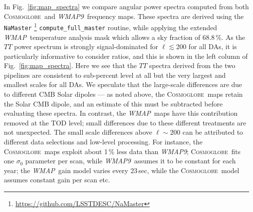 \documentclass[twocolumn]{../../common/aa}
\def\WMAP{\emph{WMAP}}
\def\WMAPnine{\emph{WMAP9}}
\newcommand{\cosmoglobe}{\textsc{Cosmoglobe}}
\newcommand{\K}[0]{\textit K}
\begin{document}










In Fig.~\ref{fig:map_spectra} we compare angular power spectra computed from both  \cosmoglobe\ and \WMAPnine\ frequency maps. These spectra are derived using the \texttt{NaMaster} \citep{namaster}\footnote{\url{https://github.com/LSSTDESC/NaMaster}} \texttt{compute\_full\_master} routine, while applying the extended \WMAP\ temperature analysis mask which allows a sky fraction of 68.8\,\%. As the $TT$ power spectrum is strongly signal-dominated for $\ell\lesssim200$ for all DAs, it is particularly informative to consider ratios, and this is shown in the left column of Fig.~\ref{fig:map_spectra}. Here we see that the $TT$ spectra derived from the two pipelines are consistent to sub-percent level at all but the very largest and smallest scales for all DAs. We speculate that the large-scale differences are due to different CMB Solar dipoles --- as noted above, the \cosmoglobe\ maps retain the Solar CMB dipole, and an estimate of this must be subtracted before evaluating these spectra. In contrast, the \WMAP\ maps have this contribution removed at the TOD level; small differences due to these different treatments are not unexpected. The small scale differences above $\ell\sim200$ can be attributed to different data selections and low-level processing. For instance, the \cosmoglobe\ maps exploit about 1\,\% less data than \WMAPnine; \cosmoglobe\ fits one $\sigma_0$ parameter per scan, while \WMAPnine\ assumes it to be constant for each year; the \WMAP\ gain model varies every 23\,sec, while the \cosmoglobe\ model assumes constant gain per scan etc.
\end{document}
